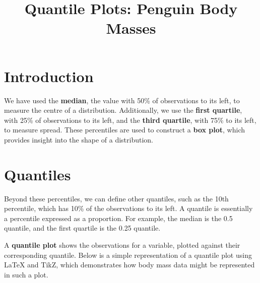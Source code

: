 \documentclass{article}
\title{Quantile Plots: Penguin Body Masses}
\author{}
\date{}
\begin{document}
\maketitle

\section*{Introduction}

We have used the \textbf{median}, the value with 50\% of observations to its left, to measure the centre of a distribution. Additionally, we use the \textbf{first quartile}, with 25\% of observations to its left, and the \textbf{third quartile}, with 75\% to its left, to measure spread. These percentiles are used to construct a \textbf{box plot}, which provides insight into the shape of a distribution.

\section*{Quantiles}

Beyond these percentiles, we can define other quantiles, such as the 10th percentile, which has 10\% of the observations to its left. A quantile is essentially a percentile expressed as a proportion. For example, the median is the 0.5 quantile, and the first quartile is the 0.25 quantile.

A \textbf{quantile plot} shows the observations for a variable, plotted against their corresponding quantile. Below is a simple representation of a quantile plot using LaTeX and TikZ, which demonstrates how body mass data might be represented in such a plot.

\begin{center}
\end{center}
\end{document}
